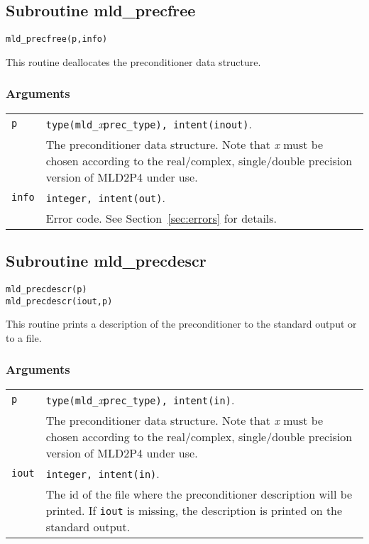 \clearpage
\subsection{Subroutine mld\_precfree\label{sec:precfree}}

\begin{center}
\verb|mld_precfree(p,info)|\\
\end{center}

\noindent
This routine deallocates the preconditioner data structure.

\subsubsection*{Arguments}

\begin{tabular}{p{1.2cm}p{11.5cm}}
\verb|p|      & \verb|type(mld_|\emph{x}\verb|prec_type), intent(inout)|.\\
              & The preconditioner data structure. Note that \emph{x} must be chosen according
                to the real/complex, single/double precision version of MLD2P4 under use.\\
\verb|info|   & \verb|integer, intent(out)|.\\
              & Error code. See Section~\ref{sec:errors} for details.\\
\end{tabular}

\clearpage
\subsection{Subroutine mld\_precdescr\label{sec:precdescr}}

\begin{center}
\verb|mld_precdescr(p)|\\
\verb|mld_precdescr(iout,p)|\\
\end{center}

\noindent
This routine prints a description of the preconditioner to the standard output or to a file.

\subsubsection*{Arguments}

\begin{tabular}{p{1.2cm}p{10.6cm}}
\verb|p|      & \verb|type(mld_|\emph{x}\verb|prec_type), intent(in)|.\\
              & The preconditioner data structure. Note that \emph{x} must be chosen according
                to the real/complex, single/double precision version of MLD2P4 under use.\\
\verb|iout|   & \verb|integer, intent(in)|.\\
              & The id of the file where the preconditioner description
                will be printed. If \verb|iout| is missing, the description is printed on
                the standard output.\\
\end{tabular}


